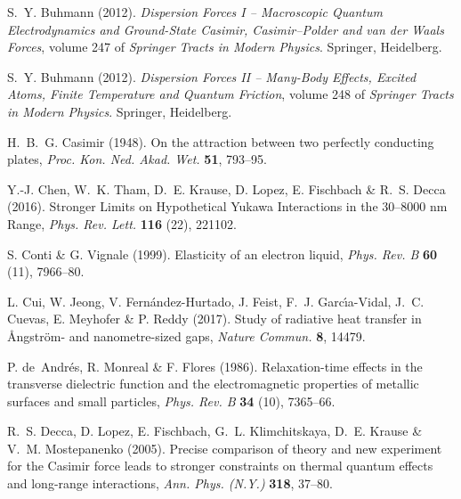 \documentclass[11pt, oneside]{article}   	%
\begin{document}
\begin{thebibliography}{58}
S.~Y. Buhmann (2012{}).
\newblock \emph{{D}ispersion {F}orces {I} -- {M}acroscopic {Q}uantum
  {E}lectrodynamics and {G}round-{S}tate {C}asimir, {C}asimir--{P}older and van
  der {W}aals {F}orces}, volume 247 of \emph{Springer Tracts in Modern
  Physics}.
\newblock Springer, Heidelberg.

S.~Y. Buhmann (2012{}).
\newblock \emph{Dispersion Forces II -- Many-Body Effects, Excited Atoms,
  Finite Temperature and Quantum Friction}, volume 248 of \emph{Springer Tracts
  in Modern Physics}.
\newblock Springer, Heidelberg.

H.~B.~G. Casimir (1948).
\newblock On the attraction between two perfectly conducting plates,
  \emph{Proc. Kon. Ned. Akad. Wet.} {\bf 51}, 793--95.

Y.-J. Chen, W.~K. Tham, D.~E. Krause, D. Lopez, E. Fischbach \& R.~S. Decca
  (2016).
\newblock Stronger Limits on Hypothetical {Y}ukawa Interactions in the 30--8000
  nm Range, \emph{Phys. Rev. Lett.} {\bf 116} (22), 221102.

S. Conti \& G. Vignale (1999).
\newblock Elasticity of an electron liquid, \emph{Phys. Rev. B} {\bf 60} (11),
  7966--80.

L. Cui, W. Jeong, V. Fern{\'a}ndez-Hurtado, J. Feist, F.~J. Garc{\'\i}a-Vidal,
  J.~C. Cuevas, E. Meyhofer \& P. Reddy (2017).
\newblock Study of radiative heat transfer in {{\AA}}ngstr{\"o}m- and
  nanometre-sized gaps, \emph{Nature Commun.} {\bf 8}, 14479.

P. de~Andr{\'e}s, R. Monreal \& F. Flores (1986).
\newblock Relaxation-time effects in the transverse dielectric function and the
  electromagnetic properties of metallic surfaces and small particles,
  \emph{Phys. Rev. B} {\bf 34} (10), 7365--66.

R.~S. Decca, D. Lopez, E. Fischbach, G.~L. Klimchitskaya, D.~E. Krause 
\& V.~M. Mostepanenko (2005).
\newblock Precise comparison of theory and new experiment for the Casimir force 
leads to stronger constraints on thermal quantum effects and long-range interactions,
  \emph{Ann. Phys. (N.Y.)} {\bf 318}, 37--80.


\end{thebibliography}
\end{document}

